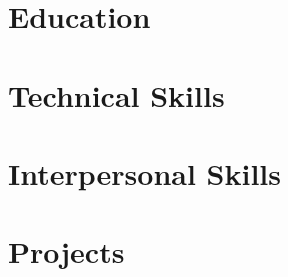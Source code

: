 \documentclass[10pt]{report}
\begin{document}
\section*{Education}

\section*{Technical Skills}

\section*{Interpersonal Skills}

\section*{Projects}
\end{document}
